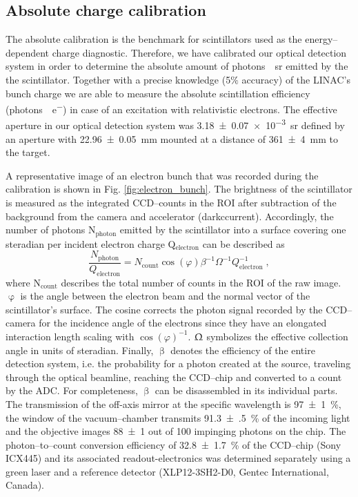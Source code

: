 \documentclass[%
preprint,
amsmath,
amssymb,
aip,
rsi, 
numerical,
floatfix,
]{revtex4-1}
\begin{document}
\subsection{\label{Ac} Absolute charge calibration}
The absolute calibration is the benchmark for scintillators used as the energy--dependent charge diagnostic. 
Therefore, we have calibrated our optical detection system in order to determine the absolute amount of \si[per-mode=symbol]{photons \per \steradian} emitted by the the scintillator.
Together with a precise knowledge (5$\%$ accuracy) of the LINAC's bunch charge we are able to measure the absolute scintillation efficiency (\si[per-mode=symbol]{photons \per e^-}) in case of an excitation with relativistic electrons.
The effective aperture in our optical detection system was \SI[separate-uncertainty = true]{3.18(7)e-3}{\steradian} defined by an aperture with \SI[separate-uncertainty = true]{22.96(5)}{\milli\metre} mounted at a distance of \SI[separate-uncertainty = true]{361(4)}{\milli\metre} to the target.

A representative image of an electron bunch that was recorded during the calibration is shown in Fig. \ref{fig:electron_bunch}. 
The brightness of the scintillator is measured as the integrated CCD--counts in the ROI after subtraction of the background from the camera and accelerator (darkccurrent). 
Accordingly, the number of photons N$_{\text{photon}}$ emitted by the scintillator into a surface covering one steradian per incident electron charge Q$_{\text{electron}}$ can be described as
\begin{equation}
\frac{N_{\text{photon}}}{Q_{\text{electron}}} = N_{\text{count}}\cos(\varphi)\beta^{-1}\Omega^{-1}Q_{\text{electron}}^{-1}{\;,}
\label{eq:ac}
\end{equation}
where N$_{\text{count}}$ describes the total number of counts in the ROI of the raw image.
$\upvarphi$ is the angle between the electron beam and the normal vector of the scintillator's surface.
The cosine corrects the photon signal recorded by the CCD--camera for the incidence angle of the electrons since they have an elongated interaction length scaling with $\cos(\varphi)^{-1}$.
$\Upomega$ symbolizes the effective collection angle in units of steradian.
Finally, $\upbeta$ denotes the efficiency of the entire detection system, i.e. the probability for a photon created at the source, traveling through the optical beamline, reaching the CCD--chip and converted to a count by the ADC.
For completeness, $\upbeta$ can be disassembled in its individual parts. 
The transmission of the off-axis mirror at the specific wavelength is \SI[separate-uncertainty = true]{97(1)}{\%}, the window of the vacuum--chamber transmits \SI[separate-uncertainty = true]{91.3(5)}{\%} of the incoming light and the objective images \num[separate-uncertainty = true]{88(1)} out of 100 impinging photons on the chip.
The photon--to--count conversion efficiency of \SI[separate-uncertainty = true]{32.8(17)}{\%} of the CCD--chip (Sony ICX445) and its associated readout-electronics was determined separately using a green laser and a reference detector (XLP12-3SH2-D0, Gentec International, Canada).
\end{document}
